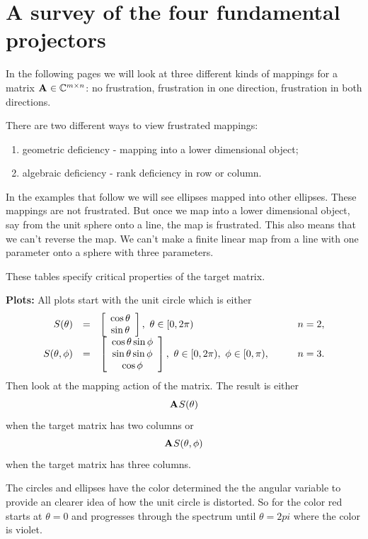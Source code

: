 \section{A survey of the four fundamental projectors}
In the following pages we will look at three different kinds of mappings for a matrix $\textbf{A}^{\mathrm{}}\in\mathbb{C}^{m \times n}$: no frustration, frustration in one direction, frustration in both directions.

There are two different ways to view frustrated mappings:
\begin{enumerate}
\item geometric deficiency - mapping into a lower dimensional object;
\item algebraic deficiency - rank deficiency in row or column.
\end{enumerate}

In the examples that follow we will see ellipses mapped into other ellipses. These mappings are not frustrated. But once we map into a lower dimensional object, say from the unit sphere onto a line, the map is frustrated. This also means that we can't reverse the map. We can't make a finite linear map from a line with one parameter onto a sphere with three parameters.

These tables specify critical properties of the target matrix.

\textbf{Plots: }All plots start with the unit circle which is either
\begin{equation}
  \begin{array}{rcll}
     S(\theta) &=& \mat{c}{\cos \theta\\\sin \theta},\ \theta\in[0,2\pi) \qquad &n=2,\\
     S(\theta,\phi) &=& \mat{c}{\cos \theta\sin \phi\\\sin \theta \sin \phi\\\cos \phi},\ \theta\in[0,2\pi),\ \phi\in[0,\pi), \qquad &n=3.
  \end{array}
\end{equation}
Then look at the mapping action of the matrix. The result is either
\begin{equation}
  \textbf{A}^{\mathrm{}}S(\theta) 
\end{equation}
when the target matrix has two columns or
\begin{equation}
  \textbf{A}^{\mathrm{}}S(\theta,\phi) 
\end{equation}
when the target matrix has three columns.

The circles and ellipses have the color determined the the angular variable to provide an clearer idea of how the unit circle is distorted. So for the color red starts at $\theta=0$ and progresses through the spectrum until $\theta=2pi$ where the color is violet.\\

